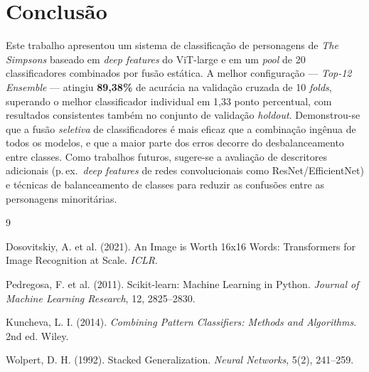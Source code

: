 \documentclass[12pt]{article}
\begin{document}
\section{Conclusão}

Este trabalho apresentou um sistema de classificação de personagens de
\textit{The Simpsons} baseado em \textit{deep features} do ViT-large e em um
\textit{pool} de 20 classificadores combinados por fusão estática. A melhor
configuração --- \textit{Top-12 Ensemble} --- atingiu \textbf{89,38\%} de
acurácia na validação cruzada de 10 \textit{folds}, superando o melhor
classificador individual em 1,33 ponto percentual, com resultados consistentes
também no conjunto de validação \textit{holdout}. Demonstrou-se que a fusão
\textit{seletiva} de classificadores é mais eficaz que a combinação ingênua de
todos os modelos, e que a maior parte dos erros decorre do desbalanceamento entre
classes. Como trabalhos futuros, sugere-se a avaliação de descritores adicionais
(p.\,ex.\ \textit{deep features} de redes convolucionais como ResNet/EfficientNet)
e técnicas de balanceamento de classes para reduzir as confusões entre as
personagens minoritárias.

\begin{thebibliography}{9}

 Dosovitskiy, A. et al. (2021). An Image is Worth 16x16 Words:
Transformers for Image Recognition at Scale. \textit{ICLR}.

 Pedregosa, F. et al. (2011). Scikit-learn: Machine Learning in
Python. \textit{Journal of Machine Learning Research}, 12, 2825--2830.

 Kuncheva, L. I. (2014). \textit{Combining Pattern Classifiers:
Methods and Algorithms}. 2nd ed. Wiley.

 Wolpert, D. H. (1992). Stacked Generalization.
\textit{Neural Networks}, 5(2), 241--259.

\end{thebibliography}
\end{document}
